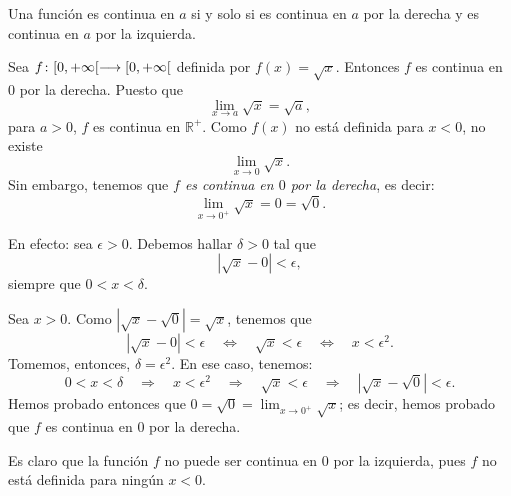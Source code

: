 \begin{teocal}Una función es continua en $a$ si y solo si es continua en $a$ por la derecha y es
continua en $a$ por la izquierda.
\end{teocal}

\begin{exemplo}[Solución]{%
Sea $f\colon [0,+\infty[\longrightarrow [0,+\infty[$ definida por $f(x)= \sqrt{x}$. Entonces $f$ es continua
en $0$ por la derecha.} Puesto que
\[
\lim_{x\to a}\sqrt{x}= \sqrt{a},
\]
para $a > 0$, $f$ es continua en $\mathbb{R}^+$. Como $f(x)$ no está definida para $x<0$, no existe
\[
\lim_{x\to 0}\sqrt{x}.
\]
Sin embargo, tenemos que \emph{$f$ es continua en $0$ por la derecha}, es decir:
\[
\lim_{x\to 0^+}\sqrt{x}=0=\sqrt{0}.
\]

En efecto: sea $\epsilon>0$. Debemos hallar $\delta >0$ tal que
\[
|\sqrt{x}-0|<\epsilon,
\]
siempre que $0<x<\delta$.

Sea $x>0$. Como $|\sqrt{x}- \sqrt{0}|=\sqrt{x}$, tenemos que
\[
|\sqrt{x}-0|<\epsilon \quad \Leftrightarrow \quad \sqrt{x}<\epsilon \quad \Leftrightarrow \quad x<\epsilon^2.
\]
Tomemos, entonces, $\delta=\epsilon^2$. En ese caso, tenemos:
\[
0<x<\delta \quad \Rightarrow \quad x<\epsilon^2 \quad \Rightarrow \quad
\sqrt{x}<\epsilon \quad \Rightarrow \quad |\sqrt{x}- \sqrt{0}|<\epsilon.
\]
Hemos probado entonces que $\displaystyle 0=\sqrt{0}= \lim_{x\to 0^+}\sqrt{x}$; es decir, hemos probado que $f$
es continua en $0$ por la derecha.

Es claro que la función $f$ no puede ser continua en $0$ por la izquierda, pues $f$ no está
definida para ningún $x < 0$.
\end{exemplo}


